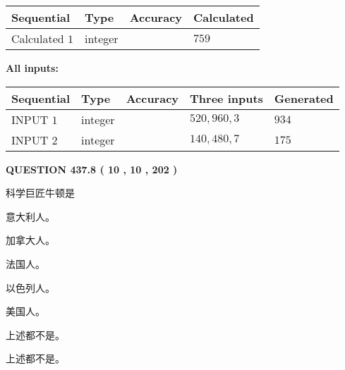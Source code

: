 \documentclass{ctexart}
\begin{document}
   
   
   
\noindent{}
   
   
  
  
\noindent\begin{tabular}{|l|l|l|l|}
\hline
 Sequential & Type & Accuracy & Calculated \\ 
\hline
 
 
  Calculated $  1 $ & integer &  & 
  $ 759 $ 
 \\  \hline  
 \end{tabular}
   
   
   
   
\noindent\vspace{0.1in}\hspace{-0.08in} {\textbf{\Large{All inputs: }}}
   
   
  
  
\noindent\begin{tabular}{|l|l|l|l|l|}
\hline
 Sequential & Type & Accuracy & Three inputs & Generated \\ 
\hline
 
 
  INPUT $  1 $ & integer &  & $
 520
 , 
 960
 , 
 3
 $ & $ 934 $ 
 \\  \hline  
 
 
  INPUT $  2 $ & integer &  & $
 140
 , 
 480
 , 
 7
 $ & $ 175 $ 
 \\  \hline  
 \end{tabular}
   
   
  
\vspace{0.2in}
  
{\textbf{\Large{QUESTION
437.8 
 ( 10 , 10 , 202 )
}}}
  
  
科学巨匠牛顿是
 
 
意大利人。
 
 
加拿大人。
 
 
法国人。
 
 
以色列人。
 
 
美国人。
 
 
 上述都不是。
 
 
\noindent{}
 
 
 上述都不是。
 
\end{document}
